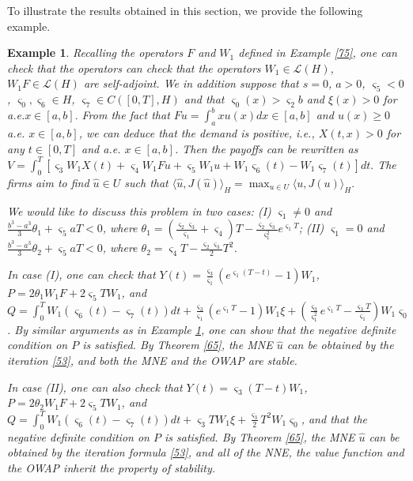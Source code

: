 \documentclass[10pt]{article}
\newtheorem{example}{Example}[section]
\begin{document}
To illustrate the results obtained in this section, we provide the following example.
\begin{example}\label{66}
Recalling the operators $F$ and $W_1$ defined in Example \ref{75}, one can check that the operators can check that the operators $W_1\in\mathcal{L}(H)$, $W_1F\in \mathcal{L}(H)$ are self-adjoint.  We in addition suppose that $s=0$,  $a>0$, $\varsigma_5<0$, $\varsigma_0,\varsigma_6\in H$, $\varsigma_7\in C([0,T],H)$ and that
$\varsigma_0(x)>\varsigma_2b$ and $\xi(x)>0$ for a.e.$x\in[a,b].$
From  the fact that $Fu=\int_a^bxu(x)dx\in[a,b]$ and $u(x)\geq0$ a.e. $x\in[a,b]$, we can deduce that the demand is positive, i.e.,
$X(t,x)>0$ for any $t\in[0,T]$ and a.e. $x\in[a,b]$. Then the payoffs can be rewritten as
$V=\int_0^T[\varsigma_3W_1X(t)+\varsigma_4W_1Fu+\varsigma_5W_1u+W_1\varsigma_6(t)-W_1\varsigma_7(t)]dt.$
The firms aim to find $\widehat{u} \in U$  such  that
$\langle \widehat{u},J(\widehat{u})\rangle_H=\max_{u\in U}\langle u,J(u)\rangle_H.$

We would like to discuss this problem in  two cases:
(I)  $\varsigma_1\neq0$ and $\frac{b^3-a^3}{3}\theta_1+\varsigma_5aT<0$, where $\theta_1=(\frac{\varsigma_2\varsigma_3}{\varsigma_1}+\varsigma_4)T-\frac{\varsigma_2\varsigma_3}{\varsigma^2_1}e^{\varsigma_1T}$; (II)  $\varsigma_1=0$ and $\frac{b^3-a^3}{3}\theta_2+\varsigma_5aT<0$, where $\theta_2=\varsigma_4T-\frac{\varsigma_2\varsigma_3}{2}T^2$.


In  case (I), one can check that
$Y(t)=\frac{\varsigma_3}{\varsigma_1}(e^{\varsigma_1(T-t)}-1)W_1$, $P=2\theta_1 W_1F+2\varsigma_5TW_1$, and  
$Q=\int_0^TW_1(\varsigma_6(t)-\varsigma_7(t))dt+\frac{\varsigma_3}{\varsigma_1}(e^{\varsigma_1T}-1)W_1\xi+(\frac{\varsigma_3}{\varsigma^2_1}e^{\varsigma_1T}-\frac{\varsigma_3T}{\varsigma_1})W_1\varsigma_0$.
By similar arguments as in Example \ref{66}, one can show that the negative definite condition on $P$ is satisfied.  By Theorem \ref{65}, the MNE $\widehat{u}$ can be obtained by the iteration \eqref{53}, and both the MNE and the OWAP are stable.


In case (II), one can also check that
$Y(t)=\varsigma_3(T-t)W_1$, $ P=2\theta_2 W_1F+2\varsigma_5TW_1$, and 
$Q=\int_0^TW_1(\varsigma_6(t)-\varsigma_7(t))dt+\varsigma_3TW_1\xi+\frac{\varsigma_3}{2}T^2W_1\varsigma_0$,
and that the negative definite condition on $P$ is satisfied. By Theorem \ref{65}, the MNE $\widehat{u}$ can be obtained by the iteration formula \eqref{53}, and all of the NNE, the value function and the OWAP   inherit the property of stability.


\end{example}
\end{document}
